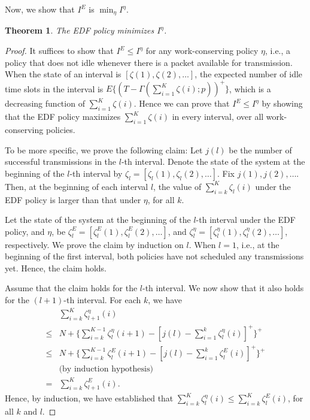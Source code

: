 \documentclass[10pt,nocopyrightspace]{sigplan-proc-varsize-1in}
\newtheorem{theorem}{Theorem}
\begin{document}
Now, we show that $I^{E}$ is $\min_\eta I^{\eta}$.
\begin{theorem}	\label{theorem:feasibility:EDF}
The EDF policy minimizes $I^{\eta}$.
\end{theorem}
\begin{proof}
It suffices to show that $I^{E}\leq I^{\eta}$ for any work-conserving policy $\eta$, i.e., a policy that does not idle whenever there is a packet available for transmission. When the state of an interval is $[\zeta(1),\zeta(2),\dots]$, the expected number of idle time slots in the interval is $E\{(T-\Gamma(\sum_{i=1}^{K}\zeta(i);p))^+\}$, which is a decreasing function of $\sum_{i=1}^{K}\zeta(i)$. Hence we can prove that $I^{E}\leq I^{\eta}$ by showing that the EDF policy maximizes $\sum_{i=1}^{K}\zeta(i)$ in every interval, over all work-conserving policies.

To be more specific, we prove the following claim: Let $j(l)$ be the number of successful transmissions in the $l$-th interval. Denote the state of the system at the beginning of the $l$-th interval by $\zeta_l=[\zeta_l(1),\zeta_l(2),\dots]$. Fix $j(1),j(2),\dots$. Then, at the beginning of each interval $l$, the value of $\sum_{i=k}^K\zeta_l(i)$ under the EDF policy is larger than that under $\eta$, for all $k$.

Let the state of the system at the beginning of the $l$-th interval under the EDF policy, and $\eta$, be $\zeta_l^E=[\zeta_l^E(1),\zeta_l^E(2),\dots]$, and $\zeta_l^\eta=[\zeta_l^\eta(1),\zeta_l^\eta(2),\dots]$, respectively. We prove the claim by induction on $l$. When $l=1$, i.e., at the beginning of the first interval, both policies have not scheduled any transmissions yet. Hence, the claim holds.

Assume that the claim holds for the $l$-th interval. We now show that it also holds for the $(l+1)$-th interval. For each $k$, we have
\begin{align*}
&\sum_{i=k}^K\zeta_{l+1}^\eta(i)\\
\leq& N+\{\sum_{i=k}^{K-1}\zeta_{l}^\eta(i+1)-[j(l)-\sum_{i=1}^{k}\zeta_{l}^\eta(i)]^+\}^+\\
\leq& N+\{\sum_{i=k}^{K-1}\zeta_{l}^E(i+1)-[j(l)-\sum_{i=1}^{k}\zeta_{l}^E(i)]^+\}^+\\
&\mbox{(by induction hypothesis)}\\
=&\sum_{i=k}^K\zeta_{l+1}^E(i).
\end{align*}
Hence, by induction, we have established that $\sum_{i=k}^K\zeta_{l}^\eta(i)\leq \sum_{i=k}^K\zeta_{l}^E(i)$, for all $k$ and $l$.
\end{proof}
\end{document}
